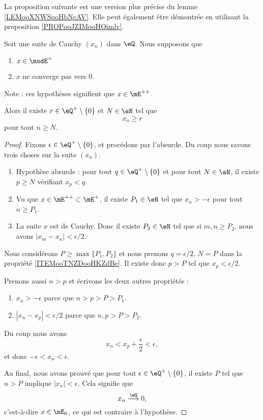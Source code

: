 La proposition suivante est une version plus précise du lemme \ref{LEMooXNWSooHbNcAV}. Elle peut également être démontrée en utilisant la proposition \ref{PROPooJZIMooHOimlv}.
\begin{proposition}			\label{PROPooZRCCooFGdtll}
	Soit une suite de Cauchy \( (x_n)\) dans \( \eQ\). Nous supposons que
	\begin{enumerate}
		\item
		      \( x\in\modE^+\)
		\item
		      \( x\) ne converge pas vers \( 0\).
	\end{enumerate}
	Note : ces hypothèses signifient que \( x\in \mE^{++}\).

	Alors il existe \( r\in \eQ^+\setminus\{ 0 \}\) et \( N\in \eN\) tel que
	\begin{equation}
		x_n\geq r
	\end{equation}
	pour tout \( n\geq N\).
\end{proposition}

\begin{proof}
	Fixons \( \epsilon\in \eQ^+\setminus\{ 0 \}\), et procédons par l'absurde. Du coup nous savons trois choses sur la suite \( (x_n)\).
	\begin{enumerate}
		\item       \label{ITEMooTNZDooHKZdBe}
		      Hypothèse absurde : pour tout \( q\in \eQ^+\setminus\{ 0 \}\) et pour tout \( N\in \eN\), il existe \( p\geq N\) vérifiant \( x_p<q\).
		\item
		      Vu que \( x\in \mE^{++}\subset \mE^+\), il existe \( P_1\in \eN\) tel que \( x_n>-\epsilon\) pour tout \( n\geq P_1\).
		\item
		      La suite \( x\) est de Cauchy. Donc il existe \( P_2\in \eN\) tel que si \( m,n\geq P_2\), nous avons \( | x_m-x_n |<\epsilon/2\).
	\end{enumerate}
	Nous considérons \( P\geq \max\{ P_1, P_2 \}\) et nous prenons \( q=\epsilon/2\), \( N=P\) dans la propriété \ref{ITEMooTNZDooHKZdBe}. Il existe donc \( p>P\) tel que \( x_p<\epsilon/2\).

	Prenons aussi \( n>p\) et écrivons les deux autres propriétés :
	\begin{enumerate}
		\item \( x_n>-\epsilon\) parce que \( n>p>P>P_1\).
		\item \( | x_n-x_p |<\epsilon/2\) parce que \( n,p>P>P_2\).
	\end{enumerate}
	Du coup nous avons
	\begin{equation}
		x_n<x_p+\frac{ \epsilon }{2}<\epsilon,
	\end{equation}
	et donc \( -\epsilon<x_n<\epsilon\).

	Au final, nous avons prouvé que pour tout \( \epsilon\in \eQ^+\setminus\{ 0 \}\), il existe \( P\) tel que \( n>P\) implique \( | x_n |<\epsilon\). Cela signifie que
	\begin{equation}
		x_n\stackrel{\eQ}{\longrightarrow}0,
	\end{equation}
	c'est-à-dire \( x\in \mE_0\), ce qui est contraire à l'hypothèse.
\end{proof}


